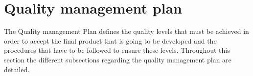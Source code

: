 \chapter{Quality management plan}
The Quality management Plan defines the quality levels that must be achieved in order to accept the final product that is going to be developed and the procedures that have to be followed to ensure these levels. Throughout this section the different subsections regarding the quality management plan are detailed.



